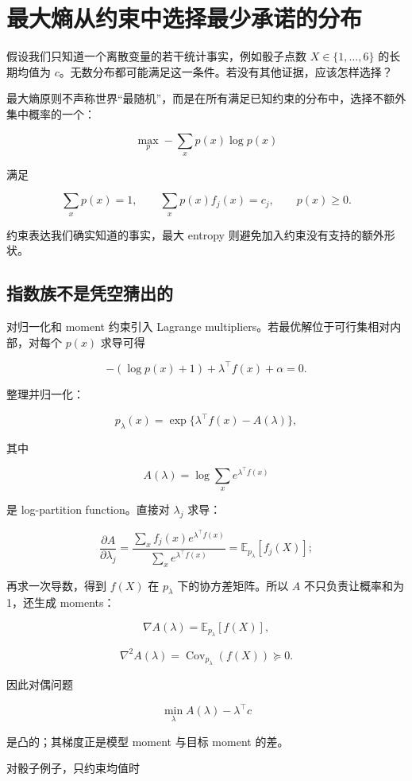 \section{最大熵从约束中选择最少承诺的分布}

假设我们只知道一个离散变量的若干统计事实，例如骰子点数 \(X\in\{1,\ldots,6\}\) 的长期均值为 \(c\)。无数分布都可能满足这一条件。若没有其他证据，应该怎样选择？

最大熵原则不声称世界``最随机''，而是在所有满足已知约束的分布中，选择不额外集中概率的一个：

\[
\max_p -\sum_xp(x)\log p(x)
\]

满足

\[
\sum_xp(x)=1,\qquad
\sum_xp(x)f_j(x)=c_j,\qquad
p(x)\ge0.
\]

约束表达我们确实知道的事实，最大 entropy 则避免加入约束没有支持的额外形状。

\subsection{指数族不是凭空猜出的}

对归一化和 moment 约束引入 Lagrange multipliers。若最优解位于可行集相对内部，对每个 \(p(x)\) 求导可得

\[
-(\log p(x)+1)
+\lambda^\top f(x)+\alpha=0.
\]

整理并归一化：

\[
p_\lambda(x)
=\exp\{\lambda^\top f(x)-A(\lambda)\},
\]

其中

\[
A(\lambda)
=\log\sum_xe^{\lambda^\top f(x)}
\]

是 log-partition function。直接对 \(\lambda_j\) 求导：

\[
\frac{\partial A}{\partial\lambda_j}
=\frac{\sum_xf_j(x)e^{\lambda^\top f(x)}}{\sum_xe^{\lambda^\top f(x)}}
=\mathbb E_{p_\lambda}[f_j(X)];
\]

再求一次导数，得到 \(f(X)\) 在 \(p_\lambda\) 下的协方差矩阵。所以 \(A\) 不只负责让概率和为 1，还生成 moments：

\[
\nabla A(\lambda)
=\mathbb E_{p_\lambda}[f(X)],
\]

\[
\nabla^2A(\lambda)
=\operatorname{Cov}_{p_\lambda}(f(X))
\succeq0.
\]

因此对偶问题

\[
\min_\lambda A(\lambda)-\lambda^\top c
\]

是凸的；其梯度正是模型 moment 与目标 moment 的差。

对骰子例子，只约束均值时

